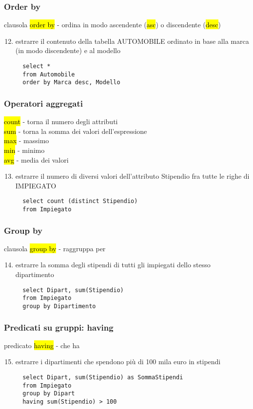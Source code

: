 \documentclass[a4paper]{article}
\begin{document}
\subsubsection{Order by}
clausola \hl{order by} - ordina in modo ascendente (\hl{asc}) o discendente (\hl{desc})
\begin{enumerate}
  \setcounter{enumi}{11}
  \item estrarre il contenuto della tabella AUTOMOBILE ordinato in base alla marca (in modo discendente) e al modello
  \begin{verbatim}
  select *
  from Automobile
  order by Marca desc, Modello
  \end{verbatim}
\end{enumerate}

\subsubsection{Operatori aggregati}
\hl{count} - torna il numero degli attributi\\
\hl{sum} - torna la somma dei valori dell’espressione\\
\hl{max} - massimo\\
\hl{min} - minimo\\
\hl{avg} - media dei valori
\begin{enumerate}
  \setcounter{enumi}{12}
  \item estrarre il numero di diversi valori dell’attributo Stipendio fra tutte le righe di IMPIEGATO
  \begin{verbatim}
  select count (distinct Stipendio)
  from Impiegato
  \end{verbatim}
\end{enumerate}

\subsubsection{Group by}
clausola \hl{group by} - raggruppa per
\begin{enumerate}
  \setcounter{enumi}{13}
  \item estrarre la somma degli stipendi di tutti gli impiegati dello stesso dipartimento
  \begin{verbatim}
  select Dipart, sum(Stipendio)
  from Impiegato
  group by Dipartimento
  \end{verbatim}
\end{enumerate}

\subsubsection{Predicati su gruppi: having}
predicato \hl{having} - che ha
\begin{enumerate}
  \setcounter{enumi}{14}
  \item estrarre i dipartimenti che spendono più di 100 mila euro in stipendi
  \begin{verbatim}
  select Dipart, sum(Stipendio) as SommaStipendi
  from Impiegato
  group by Dipart
  having sum(Stipendio) > 100
  \end{verbatim}
\end{enumerate}
\end{document}
